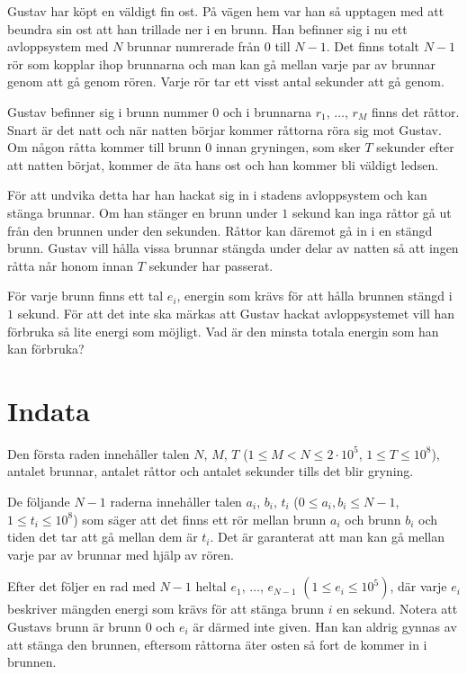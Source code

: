 \noindent

Gustav har köpt en väldigt fin ost. På vägen hem var han så upptagen med att beundra sin ost att han trillade ner i en
brunn. Han befinner sig i nu ett avloppsystem med $N$ brunnar numrerade från $0$ till $N-1$. Det finns totalt $N-1$ rör
som kopplar ihop brunnarna och man kan gå mellan varje par av brunnar genom att gå genom rören.
Varje rör tar ett visst antal sekunder att gå genom.

Gustav befinner sig i brunn nummer $0$ och i brunnarna $r_1$, $\dots$, $r_M$ finns det råttor.
Snart är det natt och när natten börjar kommer råttorna röra sig mot Gustav. Om någon råtta kommer till brunn $0$
innan gryningen, som sker $T$ sekunder efter att natten börjat, kommer de äta hans ost och han kommer bli väldigt
ledsen.

För att undvika detta har han hackat sig in i stadens avloppsystem och kan stänga brunnar. Om han stänger en
brunn under $1$ sekund kan inga råttor gå ut från den brunnen under den sekunden. Råttor kan däremot gå in i
en stängd brunn. Gustav vill hålla vissa brunnar stängda under delar av natten så att ingen råtta når honom
innan $T$ sekunder har passerat.

För varje brunn finns ett tal $e_i$, energin som krävs för att hålla brunnen stängd i $1$ sekund. För att det
inte ska märkas att Gustav hackat avloppsystemet vill han förbruka så lite energi som möjligt. Vad är den
minsta totala energin som han kan förbruka?


\section*{Indata}
Den första raden innehåller talen $N$, $M$, $T$ ($1 \leq  M < N \leq 2 \cdot 10^5$, $1 \leq T \leq 10^8$),
antalet brunnar, antalet råttor och antalet sekunder tills det blir gryning.

De följande $N-1$ raderna innehåller talen $a_i$, $b_i$, $t_i$ ($0 \leq a_i,b_i \leq N-1$, $1 \leq t_i \leq 10^8$)
som säger att det finns ett rör mellan brunn $a_i$ och brunn $b_i$ och tiden det tar att gå mellan dem
är $t_i$. Det är garanterat att man kan gå mellan varje par av brunnar med hjälp av rören. 

Efter det följer en rad med $N-1$ heltal $e_1$, $\dots$, $e_{N-1}$ $(1 \leq e_i \leq 10^5)$, där varje $e_i$
beskriver mängden energi som krävs för att stänga brunn $i$ en sekund. Notera att Gustavs brunn är brunn $0$
och $e_i$ är därmed inte given. Han kan aldrig gynnas av att stänga den brunnen, eftersom råttorna äter osten
så fort de kommer in i brunnen.

